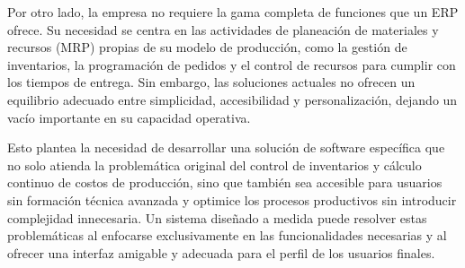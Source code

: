 Por otro lado, la empresa no requiere la gama completa de funciones que un ERP ofrece. Su necesidad se centra en las actividades de planeación de materiales y recursos (MRP) propias de su modelo de producción, como la gestión de inventarios, la programación de pedidos y el control de recursos para cumplir con los tiempos de entrega.
Sin embargo, las soluciones actuales no ofrecen un equilibrio adecuado entre simplicidad, accesibilidad y personalización, dejando un vacío importante en su capacidad operativa.

Esto plantea la necesidad de desarrollar una solución de software específica que no solo atienda la problemática original del control de inventarios y cálculo continuo de costos de producción, sino que también sea accesible para usuarios sin formación técnica avanzada y optimice los procesos productivos sin introducir complejidad innecesaria.
Un sistema diseñado a medida puede resolver estas problemáticas al enfocarse exclusivamente en las funcionalidades necesarias y al ofrecer una interfaz amigable y adecuada para el perfil de los usuarios finales.
